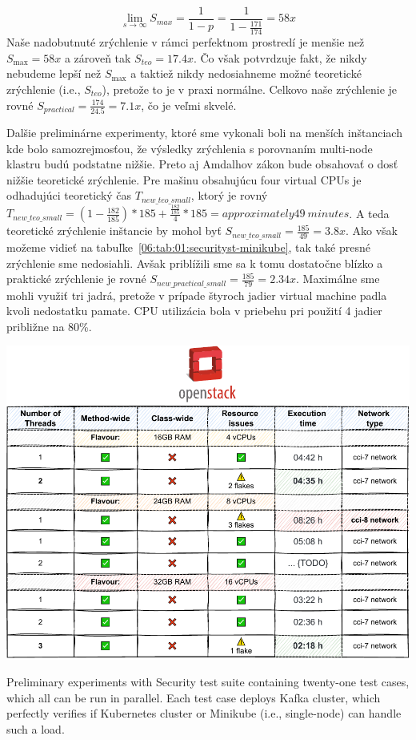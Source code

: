 \begin{equation}
    \label{eqn:amdalh-limit}
    \lim_{s\to\infty} S_{max} = \frac{1}{1-p} =  \frac{1}{1-\frac{171}{174}} = 58x
    \tag{8}
\end{equation}
Naše nadobutnuté zrýchlenie v rámci perfektnom prostredí je menšie než $S_{\max} = 58x$ a zároveň tak $S_{teo} = 17.4x$.
Čo však potvrdzuje fakt, že nikdy nebudeme lepší než $S_{\max}$ a taktiež nikdy nedosiahneme možné teoretické zrýchlenie (i.e., $S_{teo}$),
pretože to je v praxi normálne. Celkovo naše zrýchlenie je rovné $S_{practical} = \frac{174}{24.5} =7.1x$, čo je veľmi skvelé.

Dalšie preliminárne experimenty, ktoré sme vykonali boli na menších inštanciach kde bolo samozrejmosťou, že výsledky
zrýchlenia s porovnaním multi-node klastru budú podstatne nižšie. Preto aj Amdalhov zákon bude obsahovať o dosť nižšie
teoretické zrýchlenie. Pre mašinu obsahujúcu four virtual CPUs je odhadujúci teoretický čas $T_{new\_teo\_small}$, ktorý je rovný
$T_{new\_teo\_small} = (1 - \frac{182}{185}) * 185 +  \frac{ \frac{182}{185}}{4} * 185 = approximately 49~minutes$.
A teda teoretické zrýchlenie inštancie by mohol byť $S_{new\_teo\_small} = \frac{185}{49} = 3.8x$.
Ako však možeme vidieť na tabuľke~\ref{06:tab:01:securityst-minikube}, tak také presné zrýchlenie sme nedosiahli.
Avšak priblížili sme sa k tomu dostatočne blízko a praktické zrýchlenie je rovné $S_{new\_practical\_small} = \frac{185}{79} = 2.34x$.
Maximálne sme mohli využiť tri jadrá, pretože v prípade štyroch jadier virtual machine padla kvoli nedostatku pamate.
CPU utilizácia bola v priebehu pri použití 4 jadier približne na 80\%.


\begin{table}[ht!]
    \centering
    \includegraphics[scale=0.8]{obrazky-figures/08-experiments/06-exp-a-prelim}
    \caption{Preliminary experiments with Security test suite containing twenty-one test cases, which all can be run in parallel.
    Each test case deploys Kafka cluster, which perfectly verifies if Kubernetes cluster or Minikube (i.e., single-node) can handle such a load.}
    \label{06:tab:01:securityst-minikube}
\end{table}

